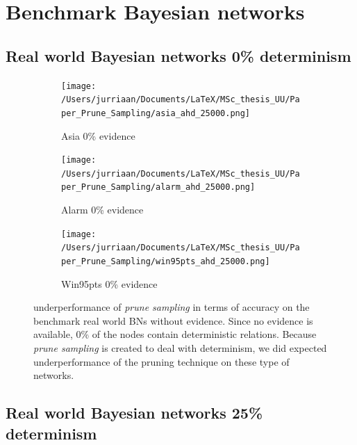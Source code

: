 \documentclass[a4paper, twoside, 11pt]{report}
\theoremstyle{plain}
\theoremstyle{definition}
\theoremstyle{remark}
\newcommand{\ps}{\textit{prune sampling }}
\begin{document}
\section{Benchmark Bayesian networks}
\subsection{Real world Bayesian networks 0\% determinism}\label{real_world_no_evidence}

\begin{figure}[H]
\centering
\begin{subfigure}{0.5\textwidth}
\texttt{[image: /Users/jurriaan/Documents/LaTeX/MSc\_thesis\_UU/Paper\_Prune\_Sampling/asia\_ahd\_25000.png]}
\caption{Asia 0\% evidence}%
\label{asia}%
\end{subfigure}\hfill%
\begin{subfigure}{0.5\textwidth}
\texttt{[image: /Users/jurriaan/Documents/LaTeX/MSc\_thesis\_UU/Paper\_Prune\_Sampling/alarm\_ahd\_25000.png]}
\caption{Alarm 0\% evidence}%
\label{alarm}%
\end{subfigure}%
\begin{subfigure}{0.5\textwidth}
\texttt{[image: /Users/jurriaan/Documents/LaTeX/MSc\_thesis\_UU/Paper\_Prune\_Sampling/win95pts\_ahd\_25000.png]}
\caption{Win95pts 0\% evidence}%
\label{win95pts}%
\end{subfigure}\hfill%
\vspace{0.75pc}
\caption{underperformance of \ps in terms of accuracy on the benchmark real world BNs without evidence. Since no evidence is available, 0\% of the nodes contain deterministic relations. Because \ps is created to deal with determinism, we did expected underperformance of the pruning technique on these type of networks.  }
\label{results2}
\end{figure}

\newpage
\subsection{Real world Bayesian networks 25\% determinism}
\end{document}
